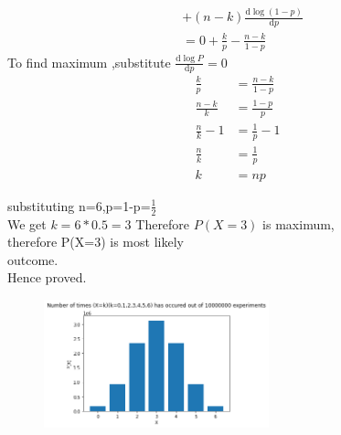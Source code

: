 \documentclass{assignment}
\begin{document}
\begin{paracol}{2}
\begin{large}
\begin{align*}
     &+(n-k) \frac{\mathrm{d}\log (1-p)}{\mathrm{d} p}\\
     &=0+\frac{k}{p}-\frac{n-k}{1-p}
\end{align*}
To find maximum ,substitute $\frac{\mathrm{d} \log P}{\mathrm{d} p}=0$
\begin{align*}
\frac{k}{p}&=\frac{n-k}{1-p}\\
\frac{n-k}{k}&=\frac{1-p}{p}\\
\frac{n}{k}-1&=\frac{1}{p}-1\\
\frac{n}{k}&=\frac{1}{p}\\
k&=np
\end{align*}
\end{large}
\begin{Large}
\switchcolumn[0]
substituting n=6,p=1-p=$\frac{1}{2}$\\
We get $k=6*0.5=3$
Therefore $P(X=3)$ is maximum,\\
therefore P(X=3) is most likely \\
outcome.\\
Hence proved.
\switchcolumn[1]
\begin{figure}
\begin{center}
\includegraphics[width=0.58\textwidth]{assignment1.png}
\end{center}
\end{figure}
\end{Large}



\end{paracol}
\end{document}
